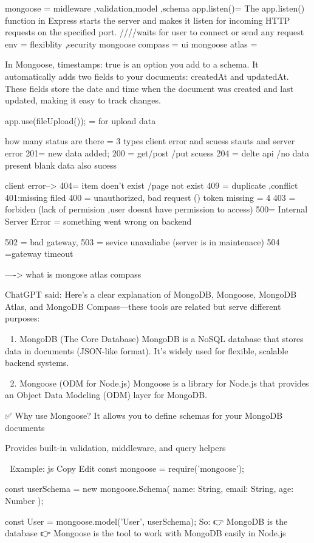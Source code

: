 mongoose = midleware ,validation,model ,schema
app.listen()= The app.listen() function in Express starts the server and makes it listen for incoming HTTP requests on the specified port. ////waits for user to connect or send any request
env = flexiblity ,security
mongoose compass = ui
mongoose atlas =

In Mongoose, timestamps: true is an option you add to a schema. It automatically adds two fields to your documents: createdAt and updatedAt. These fields store the date and time when the document was created and last updated, making it easy to track changes.

app.use(fileUpload()); = for upload data

how many status are there = 3 types client error and scuess stauts and server error
201= new data added;
200 = get/post /put scuess
204 = delte api /no data present blank data also sucess


client error-->
 404= item doen't exist /page not exist
 409 = duplicate ,conflict
 401:missing filed
 400 = unauthorized, bad request ()
 token missing = 4
 403 = forbiden (lack of permision ,user doesnt have permission to access)
500= 	Internal Server Error = something went wrong on backend

502 = bad gateway,
503 = sevice unavaliabe (server is in maintenace)
504 =gateway timeout


---->
what is mongose atlas compass


ChatGPT said:
Here’s a clear explanation of MongoDB, Mongoose, MongoDB Atlas, and MongoDB Compass—these tools are related but serve different purposes:

🧠 1. MongoDB (The Core Database)
MongoDB is a NoSQL database that stores data in documents (JSON-like format). It’s widely used for flexible, scalable backend systems.

🔗 2. Mongoose (ODM for Node.js)
Mongoose is a library for Node.js that provides an Object Data Modeling (ODM) layer for MongoDB.

✅ Why use Mongoose?
It allows you to define schemas for your MongoDB documents

Provides built-in validation, middleware, and query helpers

📘 Example:
js
Copy
Edit
const mongoose = require('mongoose');

const userSchema = new mongoose.Schema({
  name: String,
  email: String,
  age: Number
});

const User = mongoose.model('User', userSchema);
So:
👉 MongoDB is the database
👉 Mongoose is the tool to work with MongoDB easily in Node.js

